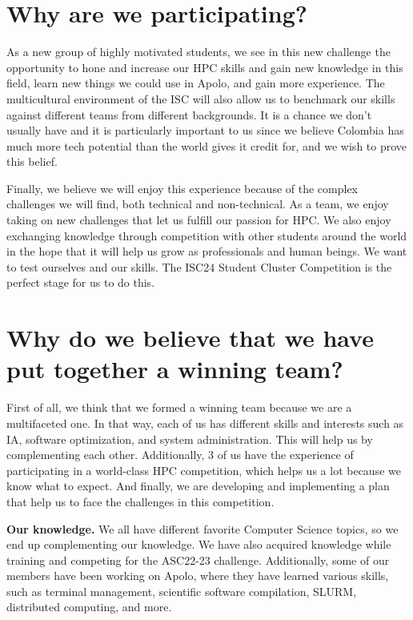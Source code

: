 \documentclass[11pt,a4paper,twocolumn]{article}
\begin{document}
\section{Why are we participating?}

As a new group of highly motivated students, we see in this new challenge the opportunity to hone and increase our HPC skills and gain new knowledge in this field, learn new things we could use in Apolo, and gain more experience. The multicultural environment of the ISC will also allow us to benchmark our skills against different teams from different backgrounds. It is a chance we don’t usually have and it is particularly important to us since we believe Colombia has much more tech potential than the world gives it credit for, and we wish to prove this belief.

Finally, we believe we will enjoy this experience because of the complex challenges we will find, both technical and non-technical. As a team, we enjoy taking on new challenges that let us fulfill our passion for HPC. We also enjoy exchanging knowledge through competition with other students around the world in the hope that it will help us grow as professionals and human beings. We want to test ourselves and our skills. The ISC24 Student Cluster Competition is the perfect stage for us to do this.

\section{Why do we believe that we have put together a winning team?}

First of all, we think that we formed a winning team because we are a multifaceted one. In that way, each of us has different skills and interests such as IA, software optimization, and system administration. This will help us by complementing each other. Additionally, 3 of us have the experience of participating in a world-class HPC competition, which helps us a lot because we know what to expect. And finally, we are developing and implementing a plan that help us to face the challenges in this competition.

\textbf{Our knowledge.} We all have different favorite Computer Science topics, so we end up complementing our knowledge. We have also acquired knowledge while training and competing for the ASC22-23 challenge. Additionally, some of our members have been working on Apolo, where they have learned various skills, such as terminal management, scientific software compilation, SLURM, distributed computing, and more.
\end{document}
